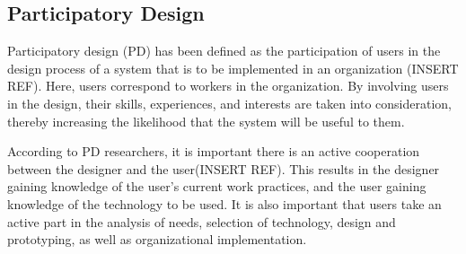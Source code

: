 
\subsection{Participatory Design}
Participatory design (PD) has been defined as the participation of users in the design process of a system that is to be implemented in an organization (INSERT REF). Here, users correspond to workers in the organization. By involving users in the design, their skills, experiences, and interests are taken into consideration, thereby increasing the likelihood that the system will be useful to them.

According to PD researchers, it is important there is an active cooperation between the designer and the user(INSERT REF). This results in the designer gaining knowledge of the user's current work practices, and the user gaining knowledge of the technology to be used. It is also important that users take an active part in the analysis of needs, selection of technology, design and prototyping, as well as organizational implementation.